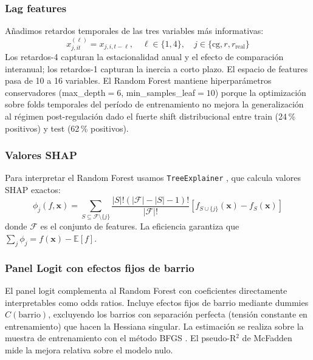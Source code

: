 \documentclass[10pt,a4paper,twocolumn]{article}
\begin{document}
\subsubsection{Lag features}

Añadimos retardos temporales de las tres variables más informativas:
\begin{equation}
  x_{j,it}^{(\ell)} = x_{j,i,t-\ell}, \quad \ell \in \{1, 4\}, \quad
  j \in \{\text{cg}, r, r_{\text{real}}\}
  \label{eq:lags}
\end{equation}
Los retardos-4 capturan la estacionalidad anual y el efecto de comparación
interanual; los retardos-1 capturan la inercia a corto plazo. El espacio de
features pasa de 10 a 16 variables. El Random Forest mantiene hiperparámetros
conservadores (max\_depth$=6$, min\_samples\_leaf$=10$) porque la optimización
sobre folds temporales del período de entrenamiento no mejora la generalización
al régimen post-regulación dado el fuerte shift distribucional entre train
(24\,\% positivos) y test (62\,\% positivos).

\subsubsection{Valores SHAP}

Para interpretar el Random Forest usamos \texttt{TreeExplainer}
\citep{lundberg2017shap}, que calcula valores SHAP exactos:
\begin{equation}
  \phi_j(f, \mathbf{x}) = \sum_{S \subseteq \mathcal{F}\setminus\{j\}}
  \frac{|S|!(|\mathcal{F}|-|S|-1)!}{|\mathcal{F}|!}
  \left[f_{S\cup\{j\}}(\mathbf{x}) - f_S(\mathbf{x})\right]
  \label{eq:shap}
\end{equation}
donde $\mathcal{F}$ es el conjunto de features. La eficiencia garantiza que
$\sum_{j} \phi_j = f(\mathbf{x}) - \mathbb{E}[f]$.

\subsubsection{Panel Logit con efectos fijos de barrio}

El panel logit complementa al Random Forest con coeficientes directamente
interpretables como odds ratios. Incluye efectos fijos de barrio mediante dummies
$C(\text{barrio})$, excluyendo los barrios con separación perfecta (tensión
constante en entrenamiento) que hacen la Hessiana singular. La estimación se
realiza sobre la muestra de entrenamiento con el método BFGS \citep{baltagi2021econometric}.
El pseudo-R$^2$ de McFadden mide la mejora relativa sobre el modelo nulo.
\end{document}
